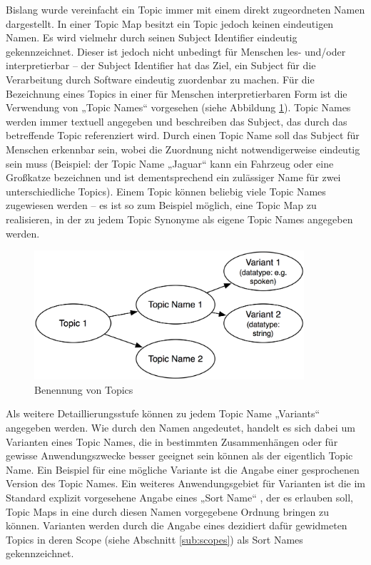 Bislang wurde vereinfacht ein Topic immer mit einem direkt zugeordneten Namen dargestellt. In einer Topic Map besitzt ein Topic jedoch keinen eindeutigen Namen. Es wird vielmehr durch seinen Subject Identifier eindeutig gekennzeichnet. Dieser ist jedoch nicht unbedingt für Menschen les- und/oder interpretierbar -- der Subject Identifier hat das Ziel, ein Subject für die Verarbeitung durch Software eindeutig zuordenbar zu machen. Für die Bezeichnung eines Topics in einer für Menschen interpretierbaren Form ist die Verwendung von „Topic Names“ vorgesehen (siehe Abbildung \ref{fig:img_Persistenz_TopicNaming}). Topic Names werden immer textuell angegeben und beschreiben das Subject, das durch das betreffende Topic referenziert wird. Durch einen Topic Name soll das Subject für Menschen erkennbar sein, wobei die Zuordnung nicht notwendigerweise eindeutig sein muss (Beispiel: der Topic Name „Jaguar“ kann ein Fahrzeug oder eine Großkatze bezeichnen und ist dementsprechend ein zulässiger Name für zwei unterschiedliche Topics). Einem Topic können beliebig viele Topic Names zugewiesen werden -- es ist so zum Beispiel möglich, eine Topic Map zu realisieren, in der zu jedem Topic Synonyme als eigene Topic Names angegeben werden. 

\begin{figure}[htbp]
	\centering
		\includegraphics[width=10cm]{img/Persistenz/TopicNaming.png}
	\caption{Benennung von Topics}
	\label{fig:img_Persistenz_TopicNaming}
\end{figure}

Als weitere Detaillierungsstufe können zu jedem Topic Name „Variants“ angegeben werden. Wie durch den Namen angedeutet, handelt es sich dabei um Varianten eines Topic Names, die in bestimmten Zusammenhängen oder für gewisse Anwendungszwecke besser geeignet sein können als der eigentlich Topic Name. Ein Beispiel für eine mögliche Variante ist die Angabe einer gesprochenen Version des Topic Names. Ein weiteres Anwendungsgebiet für Varianten ist die im Standard explizit vorgesehene Angabe eines „Sort Name“ \citep[][S. 18]{TMDM08}, der es erlauben soll, Topic Maps in eine durch diesen Namen vorgegebene Ordnung bringen zu können. Varianten werden durch die Angabe eines dezidiert dafür gewidmeten Topics in deren Scope (siehe Abschnitt \ref{sub:scopes}) als Sort Names gekennzeichnet.

